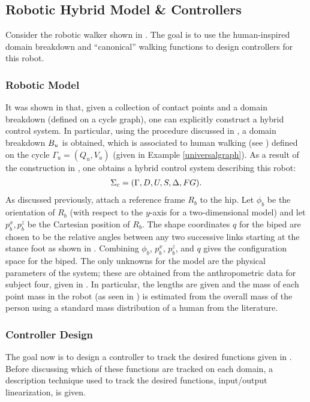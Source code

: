 \subsection{Robotic Hybrid Model \& Controllers} \noindent
Consider the robotic walker shown in . The goal is to use the human-inspired domain breakdown and ``canonical'' walking functions to design controllers for this robot.

\subsubsection{Robotic Model} It was shown in  that, given a collection of contact points and a domain breakdown (defined on a cycle graph), one can explicitly construct a hybrid control system. In particular, using the procedure discussed in , a domain breakdown $B_u$ is obtained, which is associated to human walking (see ) defined on the cycle $\Gamma_u = (Q_u,V_u)$ (given in Example \ref{universalgraph}).  As a result of the construction in , one obtains a hybrid control system describing this robot:
\begin{align}
  \label{eq:hcstime}
  \Sigma_{c} = (\Gamma, D, U, S, \Delta, FG).
\end{align}
As discussed previously, attach a reference frame $R_b$ to the hip. Let $\phi_b$ be the orientation of $R_b$ (with respect to the $y$-axis for a two-dimensional model) and let $p_b^x, p_b^z$ be the Cartesian position of $R_b$. The shape coordinates $q$ for the biped are chosen to be the relative angles between any two successive links starting at the stance foot as shown in . Combining $\phi_b$, $p_b^x$, $p_b^z$, and $q$ gives the configuration space for the biped. The only unknowns for the model are the physical parameters of the system; these are obtained from the anthropometric data for subject four, given in . In particular, the lengths are given and the mass of each point mass in the robot (as seen in ) is estimated from the overall mass of the person using a standard mass distribution of a human from the literature.\cite{Winter90}

\subsubsection{Controller Design} The goal now is to design a controller to track the desired functions given in . Before discussing which of these functions are tracked on each domain, a description technique used to track the desired functions, input/output linearization\cite{Sastry99}, is given.

